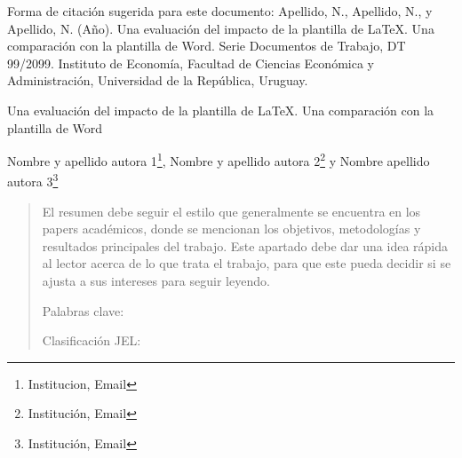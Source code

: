 \documentclass[12pt]{article}
\begin{document}
\vspace{1cm}

\noindent \small Forma de citación sugerida para este documento: Apellido, N., Apellido, N., y Apellido, N. (Año). Una evaluación del impacto de la plantilla de \LaTeX. Una comparación con la plantilla de Word. Serie Documentos de Trabajo, DT 99/2099. Instituto de Economía, Facultad de Ciencias Económica y Administración, Universidad de la República, Uruguay.


\newpage



\renewcommand{\thefootnote}{\fnsymbol{footnote}}

\begin{center}

\large Una evaluación del impacto de la plantilla de \LaTeX. Una comparación con la plantilla de Word

\vspace{7mm}

\small Nombre y apellido autora 1\footnote[1]{Institucion, Email}, Nombre y apellido autora 2\footnote[2]{Institución, Email} y Nombre apellido autora 3\footnote[3]{Institución, Email}

\end{center}

\vspace{0.5cm}


\renewcommand{\abstractname}{Resumen}
\begin{abstract}



\footnotesize \noindent El resumen debe seguir el estilo que generalmente se encuentra en los papers académicos, donde se mencionan los objetivos, metodologías y resultados principales del trabajo. Este apartado debe dar una idea rápida al lector acerca de lo que trata el trabajo, para que este pueda decidir si se ajusta a sus intereses para seguir leyendo.

\vspace{3mm}

\noindent Palabras clave: 

\vspace{3mm}

\noindent Clasificación JEL:

\end{abstract}
\end{document}
